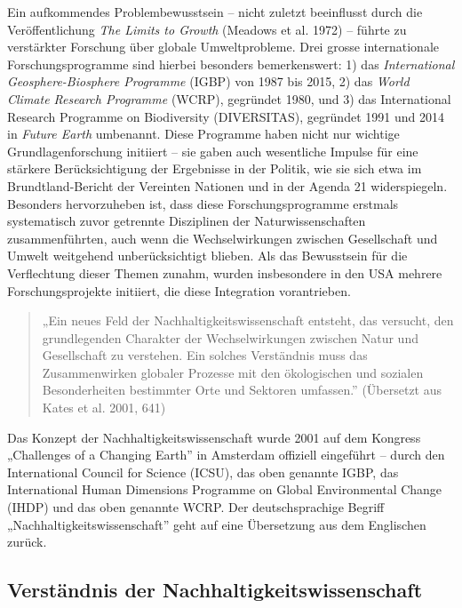 \documentclass[
  nswissgerman,
  a4paper,
  DIV=11,
  numbers=noendperiod,
  oneside,
  openany]{scrreprt}
\begin{document}
Ein aufkommendes Problembewusstsein -- nicht zuletzt beeinflusst durch
die Veröffentlichung \emph{The Limits to Growth} (Meadows et al. 1972)
-- führte zu verstärkter Forschung über globale Umweltprobleme. Drei
grosse internationale Forschungsprogramme sind hierbei besonders
bemerkenswert: 1) das \emph{International Geosphere-Biosphere Programme}
(IGBP) von 1987 bis 2015, 2) das \emph{World Climate Research Programme}
(WCRP), gegründet 1980, und 3) das International Research Programme on
Biodiversity (DIVERSITAS), gegründet 1991 und 2014 in \emph{Future
Earth} umbenannt. Diese Programme haben nicht nur wichtige
Grundlagenforschung initiiert -- sie gaben auch wesentliche Impulse für
eine stärkere Berücksichtigung der Ergebnisse in der Politik, wie sie
sich etwa im Brundtland-Bericht der Vereinten Nationen und in der Agenda
21 widerspiegeln. Besonders hervorzuheben ist, dass diese
Forschungsprogramme erstmals systematisch zuvor getrennte Disziplinen
der Naturwissenschaften zusammenführten, auch wenn die Wechselwirkungen
zwischen Gesellschaft und Umwelt weitgehend unberücksichtigt blieben.
Als das Bewusstsein für die Verflechtung dieser Themen zunahm, wurden
insbesondere in den USA mehrere Forschungsprojekte initiiert, die diese
Integration vorantrieben.

\begin{quote}
„Ein neues Feld der Nachhaltigkeitswissenschaft entsteht, das versucht,
den grundlegenden Charakter der Wechselwirkungen zwischen Natur und
Gesellschaft zu verstehen. Ein solches Verständnis muss das
Zusammenwirken globaler Prozesse mit den ökologischen und sozialen
Besonderheiten bestimmter Orte und Sektoren umfassen.'' (Übersetzt aus
Kates et al. 2001, 641)
\end{quote}

Das Konzept der Nachhaltigkeitswissenschaft wurde 2001 auf dem Kongress
„Challenges of a Changing Earth'' in Amsterdam offiziell eingeführt --
durch den International Council for Science (ICSU), das oben genannte
IGBP, das International Human Dimensions Programme on Global
Environmental Change (IHDP) und das oben genannte WCRP. Der
deutschsprachige Begriff „Nachhaltigkeitswissenschaft'' geht auf eine
Übersetzung aus dem Englischen zurück.

\subsection{Verständnis der
Nachhaltigkeitswissenschaft}\label{verstuxe4ndnis-der-nachhaltigkeitswissenschaft}
\end{document}
